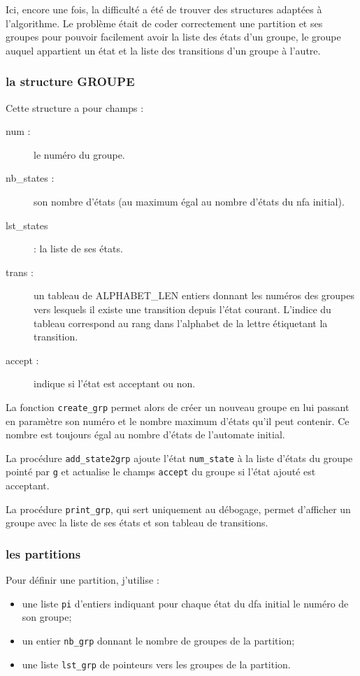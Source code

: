 \documentclass[12pt, a4paper]{article}
\begin{document}
Ici, encore une fois, la difficulté a été de trouver des structures adaptées à l'algorithme. Le problème était de coder correctement une partition et ses groupes pour pouvoir facilement avoir la liste des états d'un groupe, le groupe auquel appartient un état et la liste des transitions d'un groupe à l'autre.

\subsubsection{la structure GROUPE}

Cette structure a pour champs :
\begin{description}
\item[num :] le numéro du groupe.
\item[nb\_states :] son nombre d'états (au maximum égal au nombre d'états du nfa initial).
\item[lst\_states] : la liste de ses états.
\item[trans :]un tableau de ALPHABET\_LEN entiers donnant les numéros des groupes vers lesquels il existe une transition depuis l'état courant. L'indice du tableau correspond au rang dans l'alphabet de la lettre étiquetant la transition.
\item[accept :] indique si l'état est acceptant ou non.
\end{description}

La fonction \texttt{create\_grp} permet alors de créer un nouveau groupe en lui passant en paramètre son numéro et le nombre maximum d'états qu'il peut contenir. Ce nombre est toujours égal au nombre d'états de l'automate initial.

La procédure \texttt{add\_state2grp} ajoute l'état \texttt{num\_state} à la liste d'états du groupe pointé par \texttt{g} et actualise le champs \texttt{accept} du groupe si l'état ajouté est acceptant.

La procédure \texttt{print\_grp}, qui sert uniquement au débogage, permet d'afficher un groupe avec la liste de ses états et son tableau de transitions.

\subsubsection{les partitions}

Pour définir une partition, j'utilise :
\begin{itemize}
\item une liste \texttt{pi} d'entiers indiquant pour chaque état du dfa initial le numéro de son groupe;
\item un entier \texttt{nb\_grp} donnant le nombre de groupes de la partition;
\item une liste \texttt{lst\_grp} de pointeurs vers les groupes de la partition. 
\end{itemize}
\end{document}
